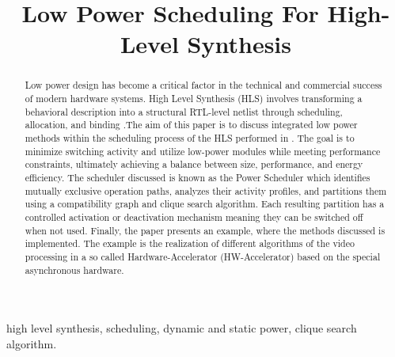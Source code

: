 \documentclass[conference]{IEEEtran}
\begin{document}
\title{Low Power Scheduling For High-Level Synthesis\\
}

\author{
}

\maketitle

\begin{abstract}
Low power design has become a critical factor in the technical and commercial success of modern hardware systems. High Level Synthesis (HLS) involves transforming a behavioral description into a structural RTL-level netlist through scheduling, allocation, and binding \cite{Ret} \cite{DDG92}.The aim of this paper is to discuss integrated low power methods within the scheduling process of the HLS performed in \cite{Ret}. The goal is to minimize switching activity and utilize low-power modules while meeting performance constraints, ultimately achieving a balance between size, performance, and energy efficiency. The scheduler discussed is known as the Power Scheduler \cite{Ret} which identifies mutually exclusive operation paths, analyzes their activity profiles, and partitions them using a compatibility graph and clique search algorithm. Each resulting partition has a controlled activation or deactivation mechanism meaning they can be switched off when not used. Finally, the paper presents an example, where the methods discussed is implemented. The example is the realization of different algorithms of the video processing in a so called Hardware-Accelerator (HW-Accelerator) based on the special asynchronous hardware.
\end{abstract}
\begin{IEEEkeywords}
high level synthesis, scheduling, dynamic and static power, clique search algorithm.
\end{IEEEkeywords}
\end{document}
